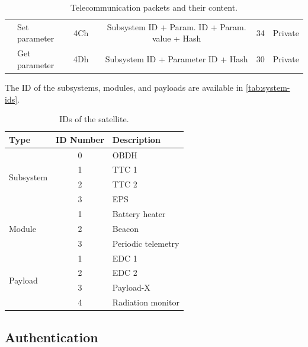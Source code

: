 \begin{landscape}
\begin{table}[ht]
\begin{tabular}{llccccc}
                                      & Set parameter         & 4Ch &                                     & Subsystem ID + Param. ID + Param. value + Hash & 34                    & Private \\
                                      & Get parameter         & 4Dh &                                     & Subsystem ID + Parameter ID + Hash             & 30                    & Private \\
            \bottomrule[1.5pt]
        \end{tabular}
        \caption{Telecommunication packets and their content.}
        \label{tab:packets-struct}
    \end{table}
\end{landscape}

The ID of the subsystems, modules, and payloads are available in \autoref{tab:system-ids}.

\begin{table}[ht]
    \centering
    \begin{tabular}{lcl}
        \toprule[1.5pt]
        \textbf{Type} & \textbf{ID Number} & \textbf{Description} \\
        \midrule
        \multirow{4}{*}{Subsystem} & 0 & OBDH \\
                                   & 1 & TTC 1 \\
                                   & 2 & TTC 2 \\
                                   & 3 & EPS \\
        \midrule
        \multirow{3}{*}{Module}    & 1 & Battery heater \\
                                   & 2 & Beacon \\
                                   & 3 & Periodic telemetry \\
        \midrule
        \multirow{4}{*}{Payload}   & 1 & EDC 1 \\
                                   & 2 & EDC 2 \\
                                   & 3 & Payload-X \\
                                   & 4 & Radiation monitor \\
        \bottomrule[1.5pt]
    \end{tabular}
    \caption{IDs of the satellite.}
    \label{tab:system-ids}
\end{table}

\subsection{Authentication}


